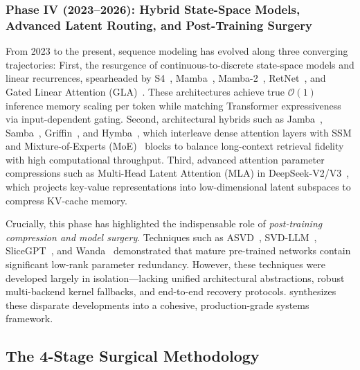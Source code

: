 \subsubsection{Phase IV (2023–2026): Hybrid State-Space Models, Advanced Latent Routing, and Post-Training Surgery}
\label{subsubsec:phase4}

From 2023 to the present, sequence modeling has evolved along three converging trajectories:
First, the resurgence of continuous-to-discrete state-space models and linear recurrences, spearheaded by S4~\cite{gu2021efficiently}, Mamba~\cite{gu2022mamba}, Mamba-2~\cite{dao2024mamba2}, RetNet~\cite{sun2023retnet}, and Gated Linear Attention (GLA)~\cite{yang2023gated}.
These architectures achieve true $\mathcal{O}(1)$ inference memory scaling per token while matching Transformer expressiveness via input-dependent gating.
Second, architectural hybrids such as Jamba~\cite{lieber2024jamba}, Samba~\cite{ren2024samba}, Griffin~\cite{de2024griffin}, and Hymba~\cite{dong2024hymba}, which interleave dense attention layers with SSM and Mixture-of-Experts (MoE)~\cite{fedus2022switch,zhou2022mixture} blocks to balance long-context retrieval fidelity with high computational throughput.
Third, advanced attention parameter compressions such as Multi-Head Latent Attention (MLA) in DeepSeek-V2/V3~\cite{deepseek2024mla}, which projects key-value representations into low-dimensional latent subspaces to compress KV-cache memory.

Crucially, this phase has highlighted the indispensable role of \emph{post-training compression and model surgery}.
Techniques such as ASVD~\cite{yuan2023asvd}, SVD-LLM~\cite{wang2024svdllm}, SliceGPT~\cite{ashkboos2024slicegpt}, and Wanda~\cite{sun2024wanda} demonstrated that mature pre-trained networks contain significant low-rank parameter redundancy.
However, these techniques were developed largely in isolation—lacking unified architectural abstractions, robust multi-backend kernel fallbacks, and end-to-end recovery protocols.
\neuralops{} synthesizes these disparate developments into a cohesive, production-grade systems framework.


\subsection{The 4-Stage \neuralops{} Surgical Methodology}
\label{subsec:methodology_4stage}

